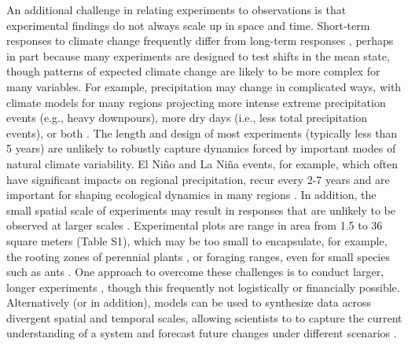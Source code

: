 \documentclass{article}
\begin{document}
\par An additional challenge in relating experiments to observations is that experimental findings do not always scale up in space and time. Short-term responses to climate change frequently differ from long-term responses \citep{woodward1992,elmendorf2012, andresen2016, reich2018}, perhaps in part because many experiments are designed to test shifts in the mean state, though patterns of expected climate change are likely to be more complex for many variables. For example, precipitation may change in complicated ways, with climate models for many regions projecting more intense extreme precipitation events (e.g., heavy downpours), more dry days (i.e., less total precipitation events), or both \citep{polade2014}. The length and design of most experiments (typically less than 5 years) are unlikely to robustly capture dynamics forced by important modes of natural climate variability. El Ni{\~n}o and La Ni{\~n}a events, for example, which often have significant impacts on regional precipitation, recur every 2-7 years and are important for shaping ecological dynamics in many regions \citep{holmgren2001}. In addition, the small spatial scale of experiments may result in responses that are unlikely to be observed at larger scales \citep{woodward1992,menke2014}. Experimental plots are range in area from 1.5 to 36 square meters (Table S1), which may be too small to encapsulate, for example, the rooting zones of perennial plants \citep{canadell1996}, or foraging ranges, even for small species such as ants \citep{menke2014}. One approach to overcome these challenges is to conduct larger, longer experiments \citep{woodward1992}, though this frequently not logistically or financially possible. Alternatively (or in addition), models can be used to synthesize data across divergent spatial and temporal scales, allowing scientists to to capture the current understanding of a system and forecast future changes under different scenarios \citep{dietze2013,medlyn2015}.
\end{document}
